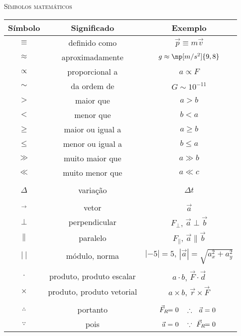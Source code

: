 \thispagestyle{plain}
\begin{fullwidth}
\begin{center}
{\noindent\LARGE\textsc{Símbolos matemáticos}} \\
\end{center}
\end{fullwidth}

\begin{table*}[!ht]
\centering
\begin{tabular}{ccc}
\toprule
Símbolo & Significado & Exemplo\\
\midrule
$\equiv$ & definido como & $\vec{p} \equiv m \vec{v}$ \\
$\approx$ & aproximadamente & $g \approx \np[m/s^2]{9,8}$\\
$\propto$ & proporcional a & $a \propto F$ \\
$\sim$ & da ordem de & $G \sim 10^{-11}$ \\
$>$ & maior que & $a>b$\\
$<$ & menor que & $b<a$\\
$\geqslant$ & maior ou igual a & $a \geqslant b$ \\
$\leqslant$ & menor ou igual a & $b \leqslant a$ \\
$\gg$ & muito maior que & $a \gg b$ \\
$\ll$ & muito menor que & $a \ll c$ \\
\\
$\Delta$ & variação & $\Delta t$ \\
\\
$\vec{~}$ & vetor & $\vec{a}$ \\
$\perp$ & perpendicular & $F_\perp$, $\vec{a}\perp\vec{b}$ \\
$\parallel$ & paralelo & $F_\parallel$, $\vec{a}\parallel\vec{b}$\\
$|~|$ & módulo, norma & $|-5| = 5$, $|\vec{a}| = \sqrt{a_x^2 + a_y^2}$
\\
\\
$\cdot$ & produto, produto escalar & $a \cdot b$, $\vec{F}\cdot\vec{d}$ \\
$\times$ & produto, produto vetorial & $a \times b$, $\vec{r}\times\vec{F}$ \\
\\
$\therefore$ & portanto & $\mathclap{\vec{F}_R} \;=\; \mathclap{0}$ $\quad\therefore\quad\mathclap{\vec{a}} \;= \;\mathclap{0}$\\
$\because$ & pois & $\mathclap{\vec{a}} \;=\; \mathclap{0}$ $\quad\because\quad \mathclap{\vec{F}_R} \;=\; \mathclap{0}$\\

\end{tabular}
\end{table*}
